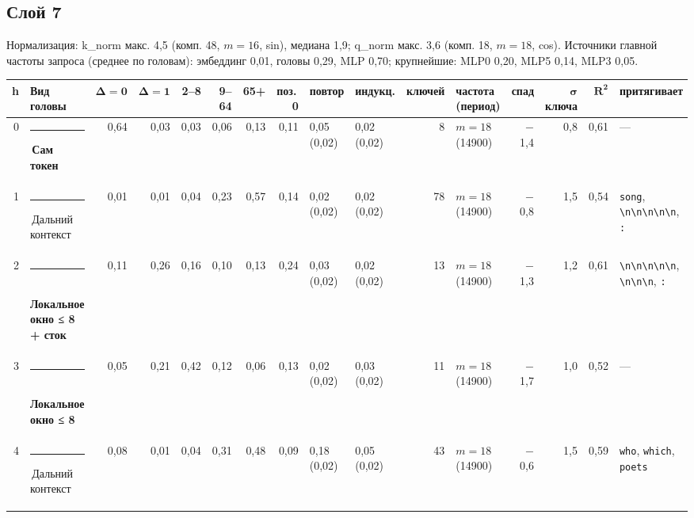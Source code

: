\documentclass[10pt]{article}
\begin{document}
\par\vspace{0.4em}
\noindent\begin{minipage}{\linewidth}
\subsection*{Слой 7}
{\small\color{ink2} Нормализация: k\_norm макс. 4,5 (комп. 48, $m{=}16$, sin), медиана 1,9; q\_norm макс. 3,6 (комп. 18, $m{=}18$, cos). Источники главной частоты запроса (среднее по головам): эмбеддинг 0,01, головы 0,29, MLP 0,70; крупнейшие: MLP0 0,20, MLP5 0,14, MLP3 0,05.}
\begin{center}{\footnotesize\begin{tabular}{|r|l|r|r|r|r|r|r|l|l|r|l|r|r|r|l|}
\hline
\rowcolor{head}\textbf{h} & \textbf{Вид головы} & $\boldsymbol{\Delta{=}0}$ & $\boldsymbol{\Delta{=}1}$ & \textbf{2–8} & \textbf{9–64} & \textbf{65+} & \textbf{поз.\,0} & \textbf{повтор} & \textbf{индукц.} & \textbf{ключей} & \textbf{частота (период)} & \textbf{спад} & $\boldsymbol{\sigma}$ \textbf{ключа} & $\boldsymbol{R^2}$ & \textbf{притягивает} \\ \hline
0 & \textcolor[HTML]{2A78D6}{\rule{0.62em}{0.62em}}\,\textbf{Сам токен} & 0,64 & 0,03 & 0,03 & 0,06 & 0,13 & 0,11 & 0,05 (0,02) & 0,02 (0,02) & 8 & $m{=}18$ (14900) & $-$1,4 & 0,8 & 0,61 & — \\ \hline
1 & \textcolor[HTML]{C3C2B7}{\rule{0.62em}{0.62em}}\,Дальний контекст & 0,01 & 0,01 & 0,04 & 0,23 & 0,57 & 0,14 & 0,02 (0,02) & 0,02 (0,02) & 78 & $m{=}18$ (14900) & $-$0,8 & 1,5 & 0,54 & \texttt{\textvisiblespace{}song}, \texttt{\textbackslash{}n\textbackslash{}n\textbackslash{}n\textbackslash{}n\textbackslash{}n}, \texttt{\textvisiblespace{}:} \\ \hline
2 & \textcolor[HTML]{1BAF7A}{\rule{0.62em}{0.62em}}\,\textbf{Локальное окно ≤ 8 + сток} & 0,11 & 0,26 & 0,16 & 0,10 & 0,13 & 0,24 & 0,03 (0,02) & 0,02 (0,02) & 13 & $m{=}18$ (14900) & $-$1,3 & 1,2 & 0,61 & \texttt{\textbackslash{}n\textbackslash{}n\textbackslash{}n\textbackslash{}n\textbackslash{}n}, \texttt{\textvisiblespace{}\textbackslash{}n\textbackslash{}n\textbackslash{}n}, \texttt{\textvisiblespace{}:} \\ \hline
3 & \textcolor[HTML]{1BAF7A}{\rule{0.62em}{0.62em}}\,\textbf{Локальное окно ≤ 8} & 0,05 & 0,21 & 0,42 & 0,12 & 0,06 & 0,13 & 0,02 (0,02) & 0,03 (0,02) & 11 & $m{=}18$ (14900) & $-$1,7 & 1,0 & 0,52 & — \\ \hline
4 & \textcolor[HTML]{C3C2B7}{\rule{0.62em}{0.62em}}\,Дальний контекст & 0,08 & 0,01 & 0,04 & 0,31 & 0,48 & 0,09 & 0,18 (0,02) & 0,05 (0,02) & 43 & $m{=}18$ (14900) & $-$0,6 & 1,5 & 0,59 & \texttt{\textvisiblespace{}who}, \texttt{\textvisiblespace{}which}, \texttt{\textvisiblespace{}poets} \\ \hline

\end{tabular}}
\end{center}
\end{minipage}
\end{document}
